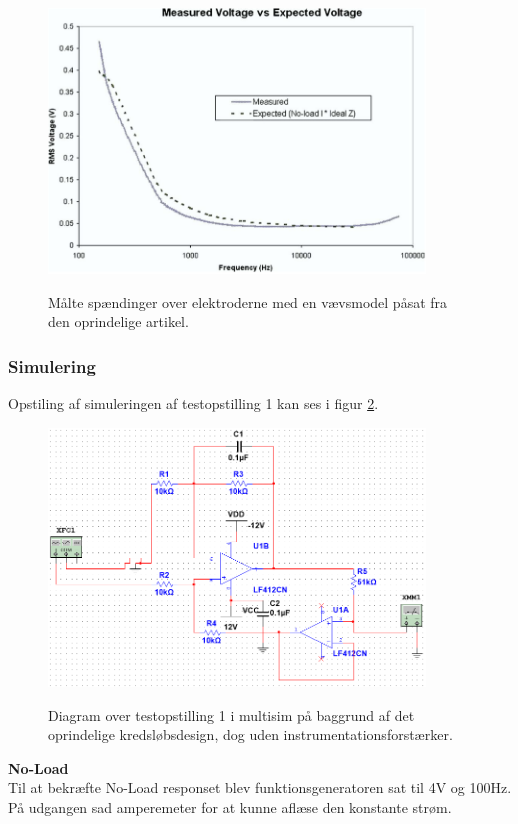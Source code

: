 \begin{figure}[H]
\centering
{\includegraphics[width=10cm]
{Figure/oprindeligerms}}
\caption{Målte spændinger over elektroderne med en vævsmodel påsat  fra den oprindelige artikel\citep{Aroom2009}.}
\label{fig:oprindeligerms}
\end{figure}

\subsubsection{Simulering}

Opstiling af simuleringen af testopstilling 1 kan ses i figur \ref{fig:testopstilling1multisim}. 

\begin{figure}[H]
\centering
{\includegraphics[width=10cm]
{Figure/testopstilling1multisim}}
\caption{Diagram over testopstilling 1 i multisim på baggrund af det oprindelige kredsløbsdesign, dog uden instrumentationsforstærker.}
\label{fig:testopstilling1multisim}
\end{figure}

\textbf{No-Load}\\
Til at bekræfte No-Load responset blev funktionsgeneratoren sat til 4V og 100Hz. På udgangen sad amperemeter for at kunne aflæse den konstante strøm.

